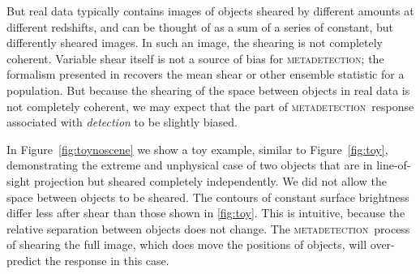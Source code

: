 \documentclass[iop, appendixfloats, numberedappendix, apj]{emulateapj}
\newcommand{\mdet}{\textsc{metadetection}}
\begin{document}
But real data typically contains images of objects sheared by different amounts
at different redshifts, and can be thought of as a sum of a series of constant,
but differently sheared images.  In such an image, the shearing is not
completely coherent.  Variable shear itself is not a source of bias for \mdet;
the formalism presented in \citep{SheldonMcal2017} recovers the mean shear or
other ensemble statistic for a population.  But because the shearing of the
space between objects in real data is not completely coherent, we may expect
that the part of \mdet\ response associated with {\em detection} to be slightly
biased.

In Figure~\ref{fig:toynoscene} we show a toy example, similar to
Figure~\ref{fig:toy}, demonstrating the extreme and unphysical case of two
objects that are in line-of-sight projection but sheared completely
independently.  We did not allow the space between objects to be sheared. The
contours of constant surface brightness differ less after shear than those
shown in \ref{fig:toy}.  This is intuitive, because the relative separation
between objects does not change.  The \mdet\ process of shearing the full
image, which does move the positions of objects, will over-predict the response
in this case.
\end{document}
